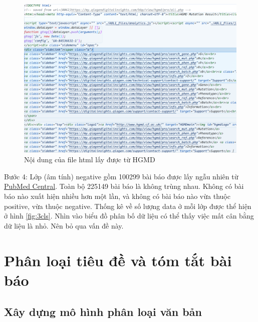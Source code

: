 \documentclass[../DoAn.tex]{subfiles}
\begin{document}
\begin{figure}
\centering
\includegraphics[width=1\linewidth]{Hinh_ve/html_hgmd_pro.png}
\caption{Nội dung của file html lấy được từ HGMD}
\label{fig:htmlHgmd}
\end{figure}

Bước 4: Lớp (âm tính) negative gồm 100299 bài báo được lấy ngẫu nhiên từ \href{https://ftp.ncbi.nlm.nih.gov/pub/pmc/}{PubMed Central}. Toàn bộ 225149 bài báo là không trùng nhau. Không có bài báo nào xuất hiện nhiều hơn một lần, và không có bài báo nào vừa thuộc positive, vừa thuộc negative. Thống kê về số lượng data ở mỗi lớp được thể hiện ở hình \ref{fig:3cls}. Nhìn vào biểu đồ phân bố dữ liệu có thể thấy việc mất cân bằng dữ liệu là nhỏ. Nên bỏ qua vấn đề này.

\section{Phân loại tiêu đề và tóm tắt bài báo}

\subsection{Xây dựng mô hình phân loại văn bản}
\end{document}

